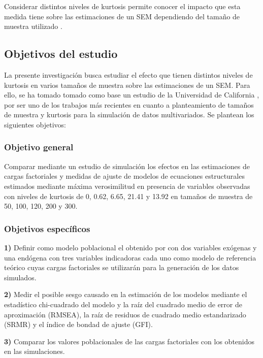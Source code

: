 \documentclass[english]{revcoles}
\begin{document}
Considerar distintos niveles de kurtosis permite conocer el impacto que esta medida tiene sobre las estimaciones de un SEM dependiendo del tamaño de muestra utilizado \cite{Muthen1992}.

\subsection{Objetivos del estudio}

La presente investigación busca estudiar el efecto que tienen distintos niveles de kurtosis en varios tamaños de muestra sobre las estimaciones de un SEM. Para ello, se ha tomado tomado como base un estudio de la Universidad de California \cite{Gao2008}, por ser uno de los trabajos más recientes en cuanto a planteamiento de tamaños de muestra y kurtosis para la simulación de datos multivariados. Se plantean los siguientes objetivos:

\subsubsection{Objetivo general}

Comparar mediante un estudio de simulación los efectos en las estimaciones de cargas factoriales y medidas de ajuste de modelos de ecuaciones estructurales estimados mediante máxima verosimilitud en presencia de variables observadas con niveles de kurtosis de 0, 0.62, 6.65, 21.41 y 13.92 en tamaños de muestra de 50, 100, 120, 200 y 300.

\subsubsection{Objetivos específicos}

\textbf{1)} Definir como modelo poblacional el obtenido por  con dos variables exógenas y una endógena con tres variables indicadoras cada uno como modelo de referencia teórico cuyas cargas factoriales se utilizarán para la generación de los datos simulados.

\textbf{2)} Medir el posible sesgo causado en la estimación de los modelos mediante el estadístico chi-cuadrado del modelo y la raíz del cuadrado medio de error de aproximación (RMSEA), la raíz de residuos de cuadrado medio estandarizado (SRMR) y el índice de bondad de ajuste (GFI).

\textbf{3)} Comparar los valores poblacionales de las cargas factoriales con los obtenidos en las simulaciones.
\end{document}
